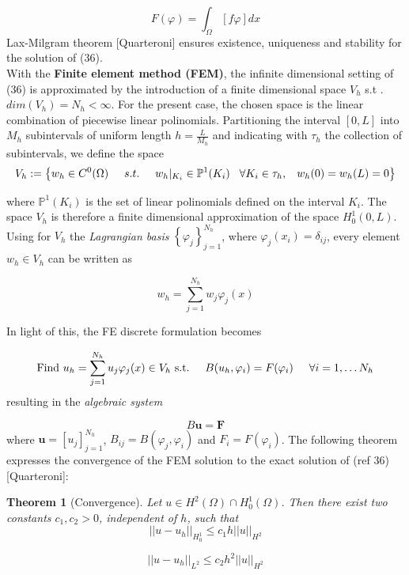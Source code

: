 \documentclass[a4paper]{article}
\newtheorem{theorem}{Theorem}[section]
\begin{document}
\begin{enumerate}
	\begin{equation}
F(\varphi) = \int_{\Omega} \left[f \varphi\right] dx
	\end{equation}
 Lax-Milgram theorem [Quarteroni] ensures existence, uniqueness and stability for the solution of (36).\\
 With the \textbf{Finite element method (FEM)}, the infinite dimensional setting of (36) is approximated by the introduction of a finite dimensional space $V_h$ s.t . $dim(V_h) = N_h < \infty$. For the present case, the chosen space is the linear combination of piecewise linear polinomials. Partitioning the interval $[0,L]$ into $M_h$ subintervals of uniform length $ h = \frac{L}{M_h}$ and indicating with $\tau_h$ the collection of subintervals, we define the space
 $$ V_h := \left\{ w_h\in C^0(\Omega) \hspace{0.5 cm} s.t. \hspace{0.5 cm} w_h|_{K_i} \in \mathbb{P}^1(K_i) \hspace{0.3 cm} \forall K_i \in \tau_h, \hspace{0.3 cm} w_h(0)=w_h(L)=0 \right\}$$
 
 where $ \mathbb{P}^1(K_i)$ is the set of linear polinomials defined on the interval $K_i$. The space $V_h$ is therefore a finite dimensional approximation of the space $H_0^1(0,L)$. Using for $V_h$ the \textit{Lagrangian basis} $ \left\{ \varphi _j \right\}_{j=1}^{N_h}$, where $ \varphi_j(x_i) = \delta_{ij}$, every element $w_h \in V_h$ can be written as
 
\begin{equation}
 w_h = \sum_{j=1}^{N_h} w_j \varphi_j(x)
\end{equation}

In light of this, the FE discrete formulation becomes

	\begin{equation}
\text{Find $u_h = \sum_{j=1}^{N_h} u_j \varphi_j(x) \in V_h$ s.t.} \hspace{0.5cm} B(u_h,\varphi_i) = F(\varphi_i) \hspace{0.5cm} \forall i = 1, \dots N_h
\end{equation}
resulting in the \textit{algebraic system}

\begin{equation}
B \textbf{u} = \textbf{F}
\end{equation}
where $\textbf{u} = [u_j]_{j=1}^{N_h}$, $B_{ij} = B(\varphi_j,\varphi_i)$ and $F_i = F(\varphi_i)$. The following theorem expresses the convergence of the FEM solution to the exact solution of (ref 36) [Quarteroni]:
\begin{theorem}[Convergence]
	Let $u \in H^2(\Omega) \cap H_0^1(\Omega)$. Then there exist two constants $c_1,c_2 >0$, independent of $h$, such that
	$$||u-u_h||_{H_0^1} \le c_1h||u||_{H^2}$$
	
	$$||u-u_h||_{L^2} \le c_2h^2||u||_{H^2}$$
\end{theorem}
\end{enumerate}
\end{document}
